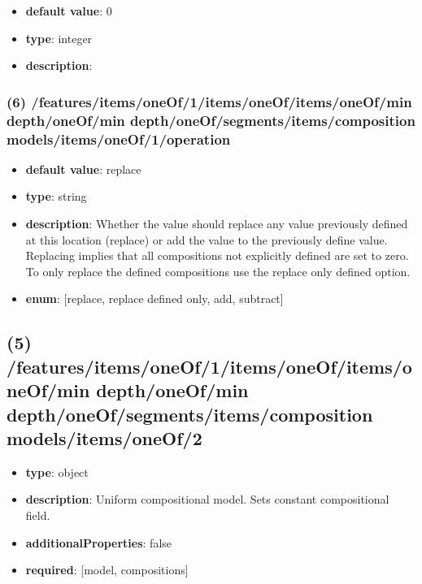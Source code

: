 \begin{itemize}[leftmargin=7em]\item {\bf default value}: 0
\item {\bf type}: integer
\item {\bf description}: 
\end{itemize}\subsubsection{(6) /features/items/oneOf/1/items/oneOf/items/oneOf/min depth/oneOf/min depth/oneOf/segments/items/composition models/items/oneOf/1/operation}
\begin{itemize}[leftmargin=6em]\item {\bf default value}: replace
\item {\bf type}: string
\item {\bf description}: Whether the value should replace any value previously defined at this location (replace) or add the value to the previously define value. Replacing implies that all compositions not explicitly defined are set to zero. To only replace the defined compositions use the replace only defined option.
\item {\bf enum}: [replace, replace defined only, add, subtract]\end{itemize}\subsection{(5) /features/items/oneOf/1/items/oneOf/items/oneOf/min depth/oneOf/min depth/oneOf/segments/items/composition models/items/oneOf/2}
\begin{itemize}[leftmargin=5em]\item {\bf type}: object
\item {\bf description}: Uniform compositional model. Sets constant compositional field.
\item {\bf additionalProperties}: false
\item {\bf required}: [model, compositions]\end{itemize}
